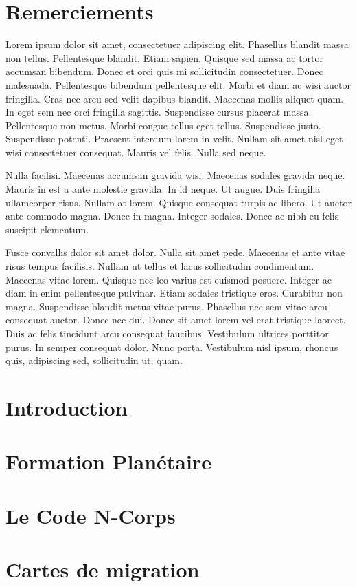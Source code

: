 \documentclass[logos,chaptertoc]{bordeaux-thesis}
\newcommand{\dummytext}{
Lorem ipsum dolor sit amet, consectetuer adipiscing elit. Phasellus blandit massa non tellus. Pellentesque blandit. Etiam sapien. Quisque sed massa ac tortor accumsan bibendum. Donec et orci quis mi sollicitudin consectetuer. Donec malesuada. Pellentesque bibendum pellentesque elit. Morbi et diam ac wisi auctor fringilla. Cras nec arcu sed velit dapibus blandit. Maecenas mollis aliquet quam. In eget sem nec orci fringilla sagittis. Suspendisse cursus placerat massa. Pellentesque non metus. Morbi congue tellus eget tellus. Suspendisse justo. Suspendisse potenti. Praesent interdum lorem in velit. Nullam sit amet nisl eget wisi consectetuer consequat. Mauris vel felis. Nulla sed neque.

Nulla facilisi. Maecenas accumsan gravida wisi. Maecenas sodales gravida neque. Mauris in est a ante molestie gravida. In id neque. Ut augue. Duis fringilla ullamcorper risus. Nullam at lorem. Quisque consequat turpis ac libero. Ut auctor ante commodo magna. Donec in magna. Integer sodales. Donec ac nibh eu felis suscipit elementum.

Fusce convallis dolor sit amet dolor. Nulla sit amet pede. Maecenas et ante vitae risus tempus facilisis. Nullam ut tellus et lacus sollicitudin condimentum. Maecenas vitae lorem. Quisque nec leo varius est euismod posuere. Integer ac diam in enim pellentesque pulvinar. Etiam sodales tristique eros. Curabitur non magna. Suspendisse blandit metus vitae purus. Phasellus nec sem vitae arcu consequat auctor. Donec nec dui. Donec sit amet lorem vel erat tristique laoreet. Duis ac felis tincidunt arcu consequat faucibus. Vestibulum ultrices porttitor purus. In semper consequat dolor. Nunc porta. Vestibulum nisl ipsum, rhoncus quis, adipiscing sed, sollicitudin ut, quam.
}
\begin{document}
\chapter*{Remerciements}
\vfill
\dummytext


\newpage


\strut\newpage

\tableofcontents

\listoffigures
\mtcaddchapter %

\listoftables
\mtcaddchapter %

\newpage


\pagestyle{fancy}

\chapter*{Introduction}



\chapter{Formation Planétaire}\label{sec:chap1}


\chapter{Le Code N-Corps}\label{sec:code_n-corps}\label{sec:chap2}



\chapter{Cartes de migration}\label{sec:chap3}

\end{document}
